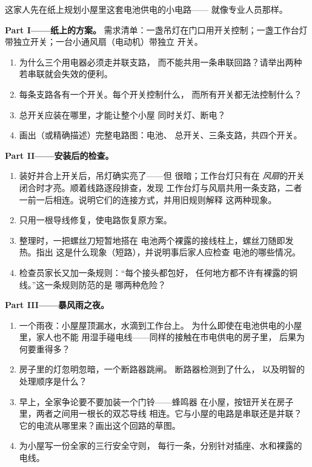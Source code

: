 \begin{problem}\label{pb:g6:circuits-and-safety:1}
这家人先在纸上规划小屋里这套电池供电的小电路——
就像专业人员那样。

\medskip\noindent\textbf{Part I——纸上的方案。}
需求清单：一盏吊灯在门口用开关控制；一盏工作台灯
带独立开关；一台小通风扇（电动机）带独立
开关。
\begin{enumerate}
  \item 为什么三个用电器必须走并联支路，
        而不能共用一条串联回路？请举出两种
        若串联就会失效的便利。
  \item 每条支路各有一个开关。每个开关控制什么，
        而所有开关都无法控制什么？
  \item 总开关应装在哪里，才能让整个小屋
        同时关灯、断电？
  \item 画出（或精确描述）完整电路图：电池、
        总开关、三条支路，共四个开关。
\end{enumerate}

\medskip\noindent\textbf{Part II——安装后的检查。}
\begin{enumerate}[resume]
  \item 装好并合上开关后，吊灯确实亮了——但
        很暗；工作台灯只有在
        \emph{风扇}的开关闭合时才亮。顺着线路逐段排查，发现
        工作台灯与风扇共用一条支路，二者
        一前一后相连。说明它们的连接方式，并用旧规则解释
        这两种现象。
  \item 只用一根导线修复，使电路恢复原方案。
  \item 整理时，一把螺丝刀短暂地搭在
        电池两个裸露的接线柱上，螺丝刀随即发热。指出
        这是什么现象（短路），并说明事后家人应检查
        电池的哪些情况。
  \item 检查员家长又加一条规则：“每个接头都包好，
        任何地方都不许有裸露的铜线。”这一条规则防范的是
        哪两种危险？
\end{enumerate}

\medskip\noindent\textbf{Part III——暴风雨之夜。}
\begin{enumerate}[resume]
  \item 一个雨夜：小屋屋顶漏水，水滴到工作台上。
        为什么即使在电池供电的小屋里，家人也不能
        用湿手碰电线——同样的接触在市电供电的房子里，
        后果为何要重得多？
  \item 房子里的灯忽明忽暗，一个断路器跳闸。
        断路器检测到了什么，
        以及明智的处理顺序是什么？
  \item 早上，全家争论要不要加装一个门铃——蜂鸣器
        在小屋，按钮开关在房子里，两者之间用一根长的双芯导线
        相连。它与小屋的电路是串联还是并联？
        它的电流从哪里来？画出这个回路的草图。
  \item 为小屋写一份全家的三行安全守则，
        每行一条，分别针对插座、水和裸露的电线。
\end{enumerate}
\end{problem}
